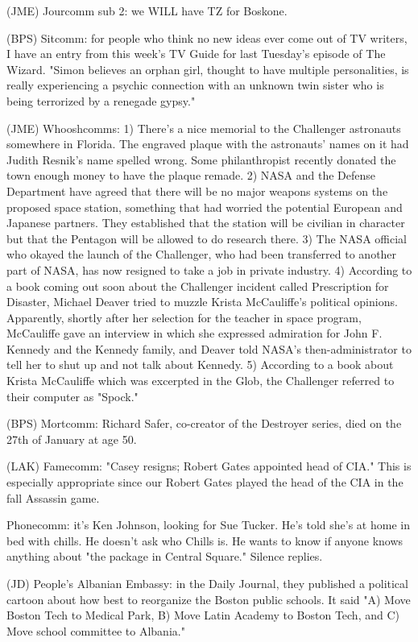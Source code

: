 \documentclass[12pt]{article}
\begin{document}
(JME) Jourcomm sub 2: we WILL have TZ for Boskone.

(BPS) Sitcomm: for people who think no new ideas ever come out of TV writers, I have an entry from this week's TV Guide for last Tuesday's episode of The Wizard. "Simon believes an orphan girl, thought to have multiple personalities, is really experiencing a psychic connection with an unknown twin sister who is being terrorized by a renegade gypsy."

(JME) Whooshcomms: 1) There's a nice memorial to the Challenger astronauts somewhere in Florida. The engraved plaque with the astronauts' names on it had Judith Resnik's name spelled wrong. Some philanthropist recently donated the town enough money to have the plaque remade. 2) NASA and the Defense Department have agreed that there will be no major weapons systems on the proposed space station, something that had worried the potential European and Japanese partners. They established that the station will be civilian in character but that the Pentagon will be allowed to do research there. 3) The NASA official who okayed the launch of the Challenger, who had been transferred to another part of NASA, has now resigned to take a job in private industry. 4) According to a book coming out soon about the Challenger incident called Prescription for Disaster, Michael Deaver tried to muzzle Krista McCauliffe's political opinions. Apparently, shortly after her selection for the teacher in space program, McCauliffe gave an interview in which she expressed admiration for John F. Kennedy and the Kennedy family, and Deaver told NASA's then-administrator to tell her to shut up and not talk about Kennedy. 5) According to a book about Krista McCauliffe which was excerpted in the Glob, the Challenger referred to their computer as "Spock."

(BPS) Mortcomm: Richard Safer, co-creator of the Destroyer series, died on the 27th of January at age 50.

(LAK) Famecomm: "Casey resigns; Robert Gates appointed head of CIA." This is especially appropriate since our Robert Gates played the head of the CIA in the fall Assassin game.

Phonecomm: it's Ken Johnson, looking for Sue Tucker. He's told she's at home in bed with chills. He doesn't ask who Chills is. He wants to know if anyone knows anything about "the package in Central Square." Silence replies.

(JD) People's Albanian Embassy: in the Daily Journal, they published a political cartoon about how best to reorganize the Boston public schools. It said "A) Move Boston Tech to Medical Park, B) Move Latin Academy to Boston Tech, and C) Move school committee to Albania."
\end{document}
